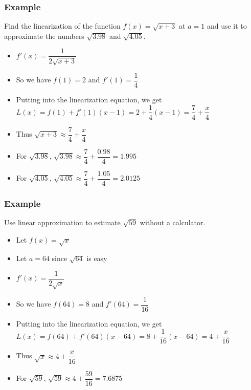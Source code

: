 \documentclass[t]{beamer}
\theoremstyle{plain}
\theoremstyle{definition}
\begin{document}
\begin{frame}

\frametitle{Example}

Find the linearization of the function $f(x) = \sqrt{x + 3}$ at $a=1$ and use it to approximate the numbers $\sqrt{3.98}$ and $\sqrt{4.05}$.  \pause

\begin{itemize}
	\item $f'(x) = \dfrac{1}{2\sqrt{x+3}}$
	\item So we have $f(1) = 2$ and $f'(1) = \dfrac{1}{4}$
	\item Putting into the linearization equation, we get $L(x) = f(1) + f'(1)(x-1) = 2 + \dfrac{1}{4}(x-1) = \dfrac{7}{4} + \dfrac{x}{4}$
	\item Thus $\sqrt{x+3} \approx \dfrac{7}{4} + \dfrac{x}{4}$
	\item For $\sqrt{3.98}$,  $\sqrt{3.98} \approx \dfrac{7}{4} + \dfrac{0.98}{4} = 1.995$
	\item For $\sqrt{4.05}$,   $\sqrt{4.05} \approx \dfrac{7}{4} + \dfrac{1.05}{4} = 2.0125$
\end{itemize}

\end{frame}

\begin{frame}

\frametitle{Example}

Use linear approximation to estimate $\sqrt{59}$ without a calculator.  \pause

\begin{itemize}
	\item Let $f(x) = \sqrt{x}$
	\item Let $a = 64$ since $\sqrt{64}$ is easy
	\item $f'(x) = \dfrac{1}{2\sqrt{x}}$
	\item So we have $f(64) = 8$ and $f'(64) = \dfrac{1}{16}$
	\item Putting into the linearization equation, we get $L(x) = f(64) + f'(64)(x-64) = 8 + \dfrac{1}{16}(x-64) = 4 + \dfrac{x}{16}$
	\item Thus $\sqrt{x} \approx 4 + \dfrac{x}{16}$
	\item For $\sqrt{59}$,  $\sqrt{59} \approx 4 + \dfrac{59}{16} = 7.6875$
\end{itemize}

\end{frame}
\end{document}
